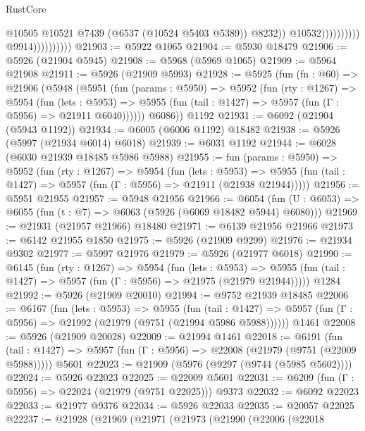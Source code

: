 \begin{lexlean}{RustCore}
\begin{coremodule}
                                                @10505
                                                @10521
                                                @7439
                                                (@6537 (@10524 @5403 @5389))
                                                @8232))
                                            @10532))))))))))
                        @9914))))))))))
@21903 := @5922 @1065
@21904 := @5930 @18479
@21906 := @5926 (@21904 @5945)
@21908 := @5968 (@5969 @1065)
@21909 := @5964 @21908
@21911 := @5926 (@21909 @5993)
@21928 := @5925
    (fun (fn : @60) =>
    @21906
      (@5948
        (@5951
          (fun (params : @5950) =>
          @5952
            (fun (rty : @1267) =>
            @5954
              (fun (lets : @5953) =>
              @5955 (fun (tail : @1427) => @5957 (fun (Γ : @5956) => @21911 @6040))))))
        @6086))
    @1192
@21931 := @6092 (@21904 (@5943 @1192))
@21934 := @6005 (@6006 @1192) @18482
@21938 := @5926 (@5997 (@21934 @6014) @6018)
@21939 := @6031 @1192
@21944 := @6028 (@6030 @21939 @18485 @5986 @5988)
@21955 := fun (params : @5950) =>
  @5952
    (fun (rty : @1267) =>
    @5954
      (fun (lets : @5953) =>
      @5955 (fun (tail : @1427) => @5957 (fun (Γ : @5956) => @21911 (@21938 @21944)))))
@21956 := @5951 @21955
@21957 := @5948 @21956
@21966 := @6054
    (fun (U : @6053) => @6055 (fun (t : @7) => @6063 (@5926 (@6069 @18482 @5944) @6080)))
@21969 := @21931 (@21957 @21966) @18480
@21971 := @6139 @21956 @21966
@21973 := @6142 @21955 @1850
@21975 := @5926 (@21909 @9299)
@21976 := @21934 @9302
@21977 := @5997 @21976
@21979 := @5926 (@21977 @6018)
@21990 := @6145
    (fun (rty : @1267) =>
    @5954
      (fun (lets : @5953) =>
      @5955 (fun (tail : @1427) => @5957 (fun (Γ : @5956) => @21975 (@21979 @21944)))))
    @1284
@21992 := @5926 (@21909 @20010)
@21994 := @9752 @21939 @18485
@22006 := @6167
    (fun (lets : @5953) =>
    @5955
      (fun (tail : @1427) =>
      @5957 (fun (Γ : @5956) => @21992 (@21979 (@9751 (@21994 @5986 @5988))))))
    @1461
@22008 := @5926 (@21909 @20028)
@22009 := @21994 @1461
@22018 := @6191
    (fun (tail : @1427) => @5957 (fun (Γ : @5956) => @22008 (@21979 (@9751 (@22009 @5988)))))
    @5601
@22023 := @21909 (@5976 (@9297 (@9744 (@5985 @5602))))
@22024 := @5926 @22023
@22025 := @22009 @5601
@22031 := @6209 (fun (Γ : @5956) => @22024 (@21979 (@9751 @22025))) @9373
@22032 := @6092 @22023
@22033 := @21977 @9376
@22034 := @5926 @22033
@22035 := @20057 @22025
@22237 := @21928
    (@21969
      (@21971
        (@21973
          (@21990
            (@22006
              (@22018

\end{coremodule}
\end{lexlean}
